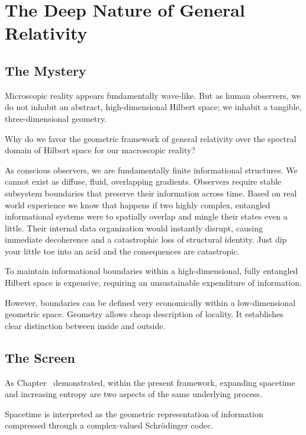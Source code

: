 \chapter{The Deep Nature of General Relativity}
\label{chap:the-nature-of-geometry}

\section*{The Mystery}

Microscopic reality appears fundamentally wave-like. 
But as human observers, we do not inhabit an abstract, high-dimensional Hilbert space; 
we inhabit a tangible, three-dimensional geometry. 

Why do we favor the geometric framework of general relativity over the spectral domain of Hilbert space for our macroscopic reality?

As conscious observers, we are fundamentally finite informational structures. We cannot exist as diffuse, fluid, overlapping gradients.
Observers require stable subsystem boundaries that preserve their information across time. 
Based on real world experience we know that happens if two highly complex, entangled informational systems were to spatially overlap and mingle their states even
a little. Their internal data organization would instantly disrupt, causing immediate decoherence and a catastrophic loss of structural identity.
Just dip your little toe into an acid and the consequences are catastropic. 

To maintain informational boundaries within a high-dimensional, fully entangled Hilbert space is expensive, requiring an unsustainable expenditure of information.

However, boundaries can be defined very economically within a low-dimensional geometric space.
Geometry allows cheap description of locality. It establishes clear distinction between inside and outside.



\section{The Screen}

As Chapter~ demonstrated, within the present framework, expanding spacetime and increasing entropy are two aspects of the same underlying process.

Spacetime is interpreted as the geometric representation of information compressed through a complex-valued Schrödinger codec.

